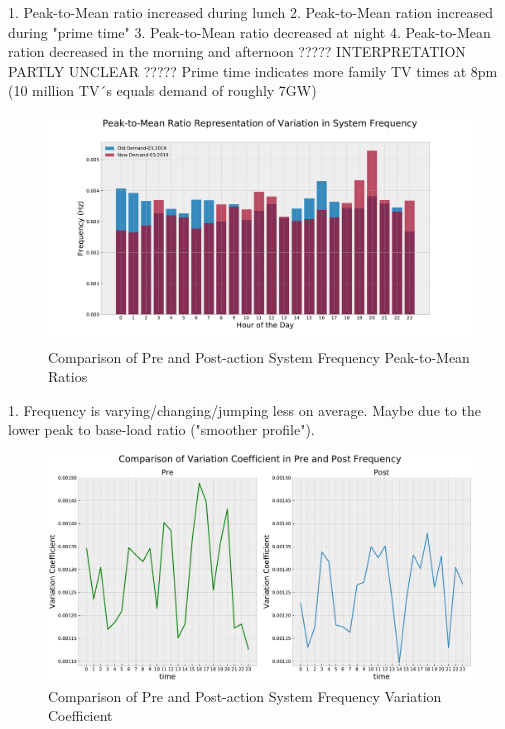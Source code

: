 \documentclass[energies,article,submit,moreauthors,pdftex]{Definitions/mdpi}
\begin{document}
1. Peak-to-Mean ratio increased during lunch
2. Peak-to-Mean ration increased during "prime time"
3. Peak-to-Mean ratio decreased at night
4. Peak-to-Mean ration decreased in the morning and afternoon
????? INTERPRETATION PARTLY UNCLEAR ????? Prime time indicates more family TV times at 8pm (10 million TV´s equals demand of roughly 7GW)


\begin{figure}[H]
\centering
\hspace{-25pt}\includegraphics[width=14 cm]{Graphics/Freq_PtM.pdf}
\caption{Comparison of Pre and Post-action System Frequency Peak-to-Mean Ratios} \label{fig:freq_hist}
\end{figure}  

1. Frequency is varying/changing/jumping less on average. Maybe due to the lower peak to base-load ratio ("smoother profile").

\begin{figure}[H]
\centering
\hspace{-25pt}\includegraphics[width=16.5 cm]{Graphics/FFreq_VarCoeff_comp_2.pdf}
\caption{Comparison of Pre and Post-action System Frequency Variation Coefficient} \label{fig:freq_hist}
\end{figure}  
\end{document}
